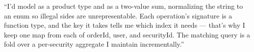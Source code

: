 \begin{say}
``I'd model  as a product type and  as a two-value sum,
normalizing the string to an enum so illegal sides are unrepresentable. Each
operation's signature is a function type, and the key it takes tells me which
index it needs --- that's why I keep one map from each of orderId, user, and
securityId. The matching query is a fold over a per-security aggregate I maintain
incrementally.''
\end{say}
